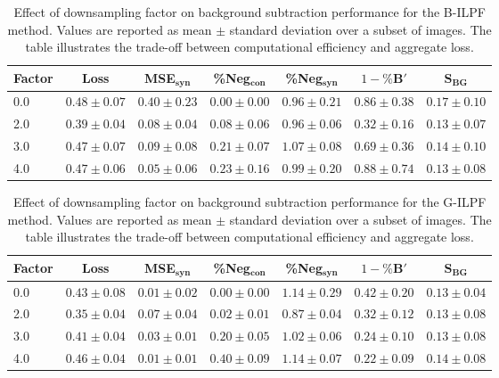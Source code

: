 \begin{table}[h]
\centering
\small
\begin{tabular}{lcccccc}
\hline
Factor & Loss & MSE$_{\mathbf{syn}}$ & \%Neg$_{\mathbf{con}}$ & \%Neg$_{\mathbf{syn}}$ & $1-\%\mathbf{B}'$ & $\mathbf{S}_{\mathbf{BG}}$ \\
\hline
0.0 & $0.48 \pm 0.07$ & $0.40 \pm 0.23$ & $0.00 \pm 0.00$ & $0.96 \pm 0.21$ & $0.86 \pm 0.38$ & $0.17 \pm 0.10$ \\
2.0 & $0.39 \pm 0.04$ & $0.08 \pm 0.04$ & $0.08 \pm 0.06$ & $0.96 \pm 0.06$ & $0.32 \pm 0.16$ & $0.13 \pm 0.07$ \\
3.0 & $0.47 \pm 0.07$ & $0.09 \pm 0.08$ & $0.21 \pm 0.07$ & $1.07 \pm 0.08$ & $0.69 \pm 0.36$ & $0.14 \pm 0.10$ \\
4.0 & $0.47 \pm 0.06$ & $0.05 \pm 0.06$ & $0.23 \pm 0.16$ & $0.99 \pm 0.20$ & $0.88 \pm 0.74$ & $0.13 \pm 0.08$ \\
\hline
\end{tabular}
\caption{Effect of downsampling factor on background subtraction performance for the B-ILPF method. Values are reported as mean $\pm$ standard deviation over a subset of images. The table illustrates the trade-off between computational efficiency and aggregate loss.}
\label{tab:downsample_sb}
\end{table}

\begin{table}[h]
\centering
\small
\begin{tabular}{lcccccc}
\hline
Factor & Loss & MSE$_{\mathbf{syn}}$ & \%Neg$_{\mathbf{con}}$ & \%Neg$_{\mathbf{syn}}$ & $1-\%\mathbf{B}'$ & $\mathbf{S}_{\mathbf{BG}}$ \\
\hline
0.0 & $0.43 \pm 0.08$ & $0.01 \pm 0.02$ & $0.00 \pm 0.00$ & $1.14 \pm 0.29$ & $0.42 \pm 0.20$ & $0.13 \pm 0.04$ \\
2.0 & $0.35 \pm 0.04$ & $0.07 \pm 0.04$ & $0.02 \pm 0.01$ & $0.87 \pm 0.04$ & $0.32 \pm 0.12$ & $0.13 \pm 0.08$ \\
3.0 & $0.41 \pm 0.04$ & $0.03 \pm 0.01$ & $0.20 \pm 0.05$ & $1.02 \pm 0.06$ & $0.24 \pm 0.10$ & $0.13 \pm 0.08$ \\
4.0 & $0.46 \pm 0.04$ & $0.01 \pm 0.01$ & $0.40 \pm 0.09$ & $1.14 \pm 0.07$ & $0.22 \pm 0.09$ & $0.14 \pm 0.08$ \\
\hline
\end{tabular}
\caption{Effect of downsampling factor on background subtraction performance for the G-ILPF method. Values are reported as mean $\pm$ standard deviation over a subset of images. The table illustrates the trade-off between computational efficiency and aggregate loss.}
\label{tab:downsample_sg}
\end{table}

